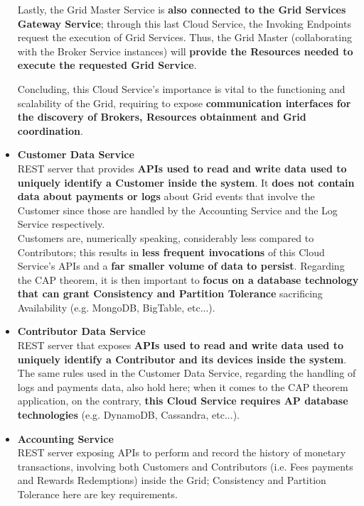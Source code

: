 \begin{itemize}
    Lastly, the Grid Master Service is \textbf{also connected to the Grid Services Gateway Service}; through this last Cloud Service, the Invoking Endpoints request the execution of Grid Services. Thus, the Grid Master (collaborating with the Broker Service instances) will \textbf{provide the Resources needed to execute the requested Grid Service}.

    Concluding, this Cloud Service's importance is vital to the functioning and scalability of the Grid, requiring to expose \textbf{communication interfaces for the discovery of Brokers, Resources obtainment and Grid coordination}.

    \item \textbf{Customer Data Service}\\
    REST server that provides \textbf{APIs used to read and write data used to uniquely identify a Customer inside the system}. It \textbf{does not contain data about payments or logs} about Grid events that involve the Customer since those are handled by the Accounting Service and the Log Service respectively.\\
    Customers are, numerically speaking, considerably less compared to Contributors; this results in \textbf{less frequent invocations} of this Cloud Service's APIs and a \textbf{far smaller volume of data to persist}. Regarding the CAP theorem, it is then important to \textbf{focus on a database technology that can grant Consistency and Partition Tolerance} sacrificing Availability (e.g. MongoDB, BigTable, etc...).

    \item \textbf{Contributor Data Service}\\
    REST server that exposes \textbf{APIs used to read and write data used to uniquely identify a Contributor and its devices inside the system}. The same rules used in the Customer Data Service, regarding the handling of logs and payments data, also hold here; when it comes to the CAP theorem application, on the contrary, \textbf{this Cloud Service requires AP database technologies} (e.g. DynamoDB, Cassandra, etc...).

    \item \textbf{Accounting Service}\\
    REST server exposing APIs to perform and record the history of monetary transactions, involving both Customers and Contributors (i.e. Fees payments and Rewards Redemptions) inside the Grid; Consistency and Partition Tolerance here are key requirements.


\end{itemize}
